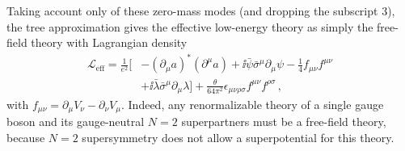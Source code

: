 Taking account only of these zero-mass modes (and dropping the subscript 3),
the tree approximation gives the effective low-energy theory as simply the
free-field theory with Lagrangian density
\begin{equation}
  \begin{aligned}
  \mathcal{L}_{\mathrm{eff}}
  =\frac{1}{e^2}\Biggl[
  &-(\partial_\mu a)^*(\partial^\mu a)
  +\ii\bar\psi\bar\sigma^\mu\partial_\mu\psi
  -\frac14 f_{\mu\nu}f^{\mu\nu}
  \\
  &+\ii\bar\lambda\bar\sigma^\mu\partial_\mu\lambda
  \Biggr]
  +\frac{\theta}{64\pi^2}
    \epsilon_{\mu\nu\rho\sigma}f^{\mu\nu}f^{\rho\sigma}\,,
  \end{aligned}
  \tag{29.5.8}\label{eq:29.5.8}
\end{equation}
with \(f_{\mu\nu}=\partial_\mu V_\nu-\partial_\nu V_\mu\). Indeed, any
renormalizable theory of a single gauge boson and its gauge-neutral \(N=2\)
superpartners must be a free-field theory, because \(N=2\) supersymmetry
does not allow a superpotential for this theory.

